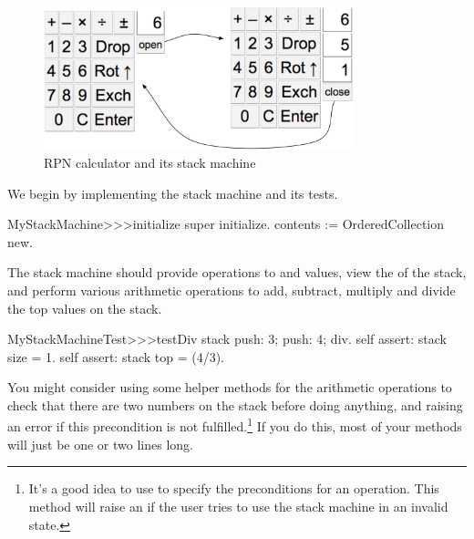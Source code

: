 \documentclass[a4paper,10pt,twoside]{book}
\begin{document}
\begin{figure}[ht]
\begin{center}
\includegraphics[width=0.8\textwidth]{stackMachine}
\caption{RPN calculator and its stack machine}
\label{fig:stackMachine}
\end{center}
\end{figure}

We begin by implementing the stack machine and its tests.


\begin{code}{}
MyStackMachine>>>initialize
	super initialize.
	contents := OrderedCollection new.
\end{code}

The stack machine should provide operations to  and  values, view the  of the stack, and perform various arithmetic operations to add, subtract, multiply and divide the top values on the stack.


\begin{code}{}
MyStackMachineTest>>>testDiv
	stack
		push: 3;
		push: 4;
		div.
	self assert: stack size = 1.
	self assert: stack top = (4/3).
\end{code}

You might consider using some helper methods for the arithmetic operations to check that there are two numbers on the stack before doing anything, and raising an error if this precondition is not fulfilled.\footnote{It's a good idea to use  to specify the preconditions for an operation.
This method will raise an  if the user tries to use the stack machine in an invalid state.}
If you do this, most  of your methods will just be one or two lines long.
\end{document}

